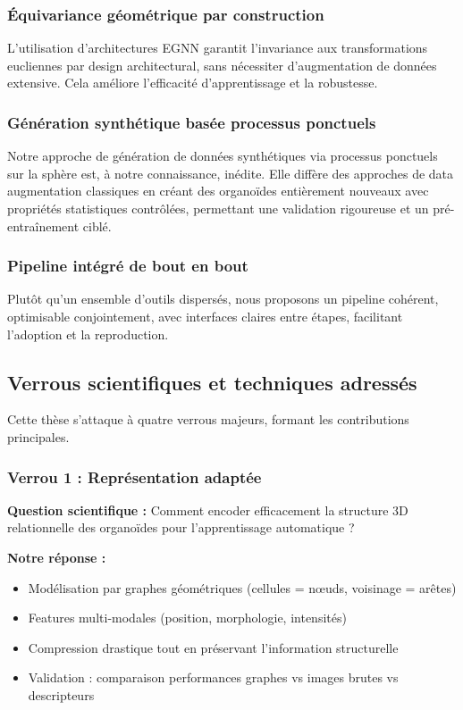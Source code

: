 \subsubsection{Équivariance géométrique par construction}

L'utilisation d'architectures EGNN garantit l'invariance aux transformations eucliennes par design architectural, sans nécessiter d'augmentation de données extensive. Cela améliore l'efficacité d'apprentissage et la robustesse.

\subsubsection{Génération synthétique basée processus ponctuels}

Notre approche de génération de données synthétiques via processus ponctuels sur la sphère est, à notre connaissance, inédite. Elle diffère des approches de data augmentation classiques en créant des organoïdes entièrement nouveaux avec propriétés statistiques contrôlées, permettant une validation rigoureuse et un pré-entraînement ciblé.

\subsubsection{Pipeline intégré de bout en bout}

Plutôt qu'un ensemble d'outils dispersés, nous proposons un pipeline cohérent, optimisable conjointement, avec interfaces claires entre étapes, facilitant l'adoption et la reproduction.

\subsection{Verrous scientifiques et techniques adressés}

Cette thèse s'attaque à quatre verrous majeurs, formant les contributions principales.

\subsubsection{Verrou 1 : Représentation adaptée}

\textbf{Question scientifique :} Comment encoder efficacement la structure 3D relationnelle des organoïdes pour l'apprentissage automatique ?

\textbf{Notre réponse :}
\begin{itemize}
    \item Modélisation par graphes géométriques (cellules = nœuds, voisinage = arêtes)
    \item Features multi-modales (position, morphologie, intensités)
    \item Compression drastique tout en préservant l'information structurelle
    \item Validation : comparaison performances graphes vs images brutes vs descripteurs
\end{itemize}

